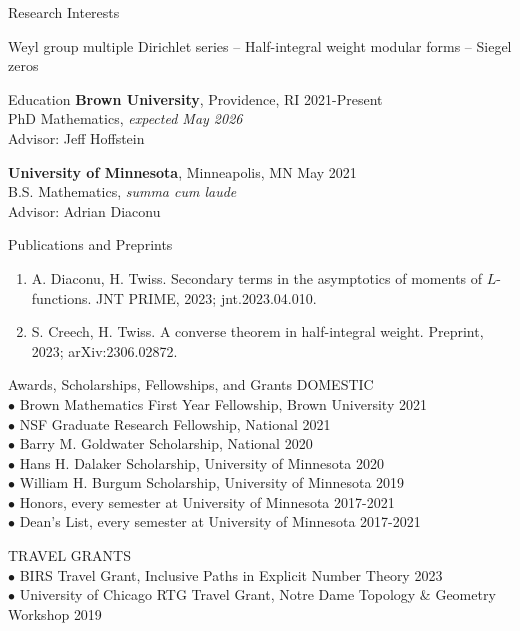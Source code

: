 \documentclass{resume} %
\begin{document}
\begin{rSection}{Research Interests}
    \begin{center}Weyl group multiple Dirichlet series -- Half-integral weight modular forms -- Siegel zeros\end{center}
\end{rSection}

\begin{rSection}{Education}
    {\bf Brown University}, Providence, RI \hfill {2021-Present} \\
    PhD Mathematics, \textit{expected May 2026} \\
    \hphantom{\quad}Advisor: Jeff Hoffstein

    {\bf University of Minnesota}, Minneapolis, MN \hfill {May 2021} \\
    B.S. Mathematics, \textit{summa cum laude} \\
    \hphantom{\quad}Advisor: Adrian Diaconu
\end{rSection}

\begin{rSection}{Publications and Preprints}
    \begin{enumerate}
        \item {A. Diaconu, H. Twiss. Secondary terms in the asymptotics of moments of $L$-functions. JNT PRIME, 2023; jnt.2023.04.010.}
        \item {S. Creech, H. Twiss. A converse theorem in half-integral weight. Preprint, 2023; arXiv:2306.02872.}
    \end{enumerate}
\end{rSection}

\begin{rSection}{Awards, Scholarships, Fellowships, and Grants}
    DOMESTIC \\
    {$\bullet$ Brown Mathematics First Year Fellowship, Brown University} \hfill {2021} \\
    {$\bullet$ NSF Graduate Research Fellowship, National} \hfill {2021} \\
    {$\bullet$ Barry M. Goldwater Scholarship, National} \hfill {2020} \\
    {$\bullet$ Hans H. Dalaker Scholarship, University of Minnesota} \hfill {2020} \\
    {$\bullet$ William H. Burgum Scholarship, University of Minnesota} \hfill {2019} \\
    {$\bullet$ Honors, every semester at University of Minnesota} \hfill {2017-2021} \\
    {$\bullet$ Dean's List, every semester at University of Minnesota} \hfill {2017-2021}

    TRAVEL GRANTS \\
    {$\bullet$ BIRS Travel Grant, Inclusive Paths in Explicit Number Theory} \hfill {2023} \\
    {$\bullet$ University of Chicago RTG Travel Grant, Notre Dame Topology \& Geometry Workshop} \hfill {2019} 
\end{rSection}
\end{document}
